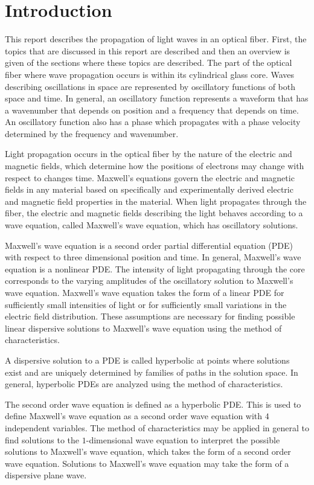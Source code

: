 \documentclass[12pt]{article}
\theoremstyle{definition}
\numberwithin{equation}{section}
\begin{document}
\section{Introduction}
This report describes the propagation of light waves in an optical fiber. First, the topics that are discussed in this report are described and then an overview is given of the sections where these topics are described. The part of the optical fiber where wave propagation occurs is within its cylindrical glass core. Waves describing oscillations in space are represented by oscillatory functions of both space and time. In general, an oscillatory function represents a waveform that has a wavenumber that depends on position and a frequency that depends on time. An oscillatory function also has a phase which propagates with a phase velocity determined by the frequency and wavenumber.

Light propagation occurs in the optical fiber by the nature of the electric and magnetic fields, which determine how the positions of electrons may change with respect to changes time. Maxwell's equations govern the electric and magnetic fields in any material based on specifically and experimentally derived electric and magnetic field properties in the material. When light propagates through the fiber, the electric and magnetic fields describing the light behaves according to a wave equation, called Maxwell's wave equation, which has oscillatory solutions. 

Maxwell's wave equation is a second order partial differential equation (PDE) with respect to three dimensional position and time. In general, Maxwell's wave equation is a nonlinear PDE. The intensity of light propagating through the core corresponds to the varying amplitudes of the oscillatory solution to Maxwell's wave equation. Maxwell's wave equation takes the form of a linear PDE for sufficiently small intensities of light or for sufficiently small variations in the electric field distribution. These assumptions are necessary for finding possible linear dispersive solutions to Maxwell's wave equation using the method of characteristics.

A dispersive solution to a PDE is called hyperbolic at points where solutions exist and are uniquely determined by families of paths in the solution space. In general, hyperbolic PDEs are analyzed using the method of characteristics.

The second order wave equation is defined as a hyperbolic PDE. This is used to define Maxwell's wave equation as a second order wave equation with $4$ independent variables. The method of characteristics may be applied in general to find solutions to the $1$-dimensional wave equation to interpret the possible solutions to Maxwell's wave equation, which takes the form of a second order wave equation. Solutions to Maxwell's wave equation may take the form of a dispersive plane wave.
\end{document}
